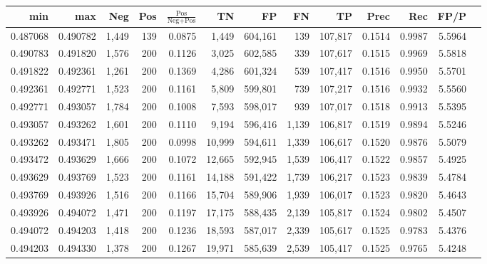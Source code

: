 \begin{tabular}{rrrrrrrrrrrrr}
\toprule
     min &      max &   Neg & Pos & $\frac{\text{Pos}}{\text{Neg}+\text{Pos}}$ &      TN &      FP &      FN &      TP &   Prec &    Rec &   FP/P \\
\midrule
0.487068 & 0.490782 & 1,449 & 139 &                                     0.0875 &   1,449 & 604,161 &     139 & 107,817 & 0.1514 & 0.9987 & 5.5964 \\
0.490783 & 0.491820 & 1,576 & 200 &                                     0.1126 &   3,025 & 602,585 &     339 & 107,617 & 0.1515 & 0.9969 & 5.5818 \\
0.491822 & 0.492361 & 1,261 & 200 &                                     0.1369 &   4,286 & 601,324 &     539 & 107,417 & 0.1516 & 0.9950 & 5.5701 \\
0.492361 & 0.492771 & 1,523 & 200 &                                     0.1161 &   5,809 & 599,801 &     739 & 107,217 & 0.1516 & 0.9932 & 5.5560 \\
0.492771 & 0.493057 & 1,784 & 200 &                                     0.1008 &   7,593 & 598,017 &     939 & 107,017 & 0.1518 & 0.9913 & 5.5395 \\
0.493057 & 0.493262 & 1,601 & 200 &                                     0.1110 &   9,194 & 596,416 &   1,139 & 106,817 & 0.1519 & 0.9894 & 5.5246 \\
0.493262 & 0.493471 & 1,805 & 200 &                                     0.0998 &  10,999 & 594,611 &   1,339 & 106,617 & 0.1520 & 0.9876 & 5.5079 \\
0.493472 & 0.493629 & 1,666 & 200 &                                     0.1072 &  12,665 & 592,945 &   1,539 & 106,417 & 0.1522 & 0.9857 & 5.4925 \\
0.493629 & 0.493769 & 1,523 & 200 &                                     0.1161 &  14,188 & 591,422 &   1,739 & 106,217 & 0.1523 & 0.9839 & 5.4784 \\
0.493769 & 0.493926 & 1,516 & 200 &                                     0.1166 &  15,704 & 589,906 &   1,939 & 106,017 & 0.1523 & 0.9820 & 5.4643 \\
0.493926 & 0.494072 & 1,471 & 200 &                                     0.1197 &  17,175 & 588,435 &   2,139 & 105,817 & 0.1524 & 0.9802 & 5.4507 \\
0.494072 & 0.494203 & 1,418 & 200 &                                     0.1236 &  18,593 & 587,017 &   2,339 & 105,617 & 0.1525 & 0.9783 & 5.4376 \\
0.494203 & 0.494330 & 1,378 & 200 &                                     0.1267 &  19,971 & 585,639 &   2,539 & 105,417 & 0.1525 & 0.9765 & 5.4248 \\

\end{tabular}
